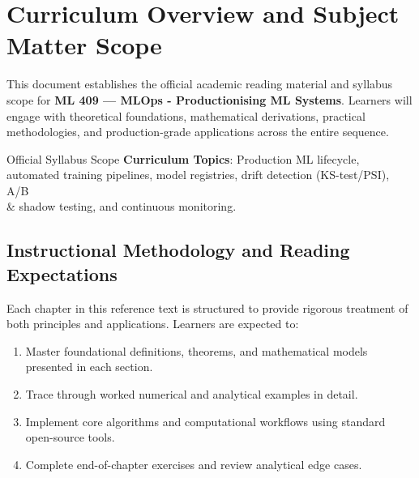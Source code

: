 \section{Curriculum Overview and Subject Matter Scope}

This document establishes the official academic reading material and syllabus scope for \textbf{ML 409 --- MLOps - Productionising ML Systems}. Learners will engage with theoretical foundations, mathematical derivations, practical methodologies, and production-grade applications across the entire sequence.

\begin{InsightBox}{Official Syllabus Scope}
  \textbf{Curriculum Topics}: Production ML lifecycle, automated training pipelines, model registries, drift detection (KS-test/PSI), A/B \\& shadow testing, and continuous monitoring.
\end{InsightBox}

\subsection{Instructional Methodology and Reading Expectations}

Each chapter in this reference text is structured to provide rigorous treatment of both principles and applications. Learners are expected to:
\begin{enumerate}
  \item Master foundational definitions, theorems, and mathematical models presented in each section.
  \item Trace through worked numerical and analytical examples in detail.
  \item Implement core algorithms and computational workflows using standard open-source tools.
  \item Complete end-of-chapter exercises and review analytical edge cases.
\end{enumerate}

